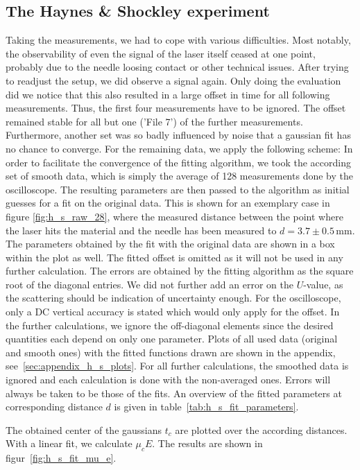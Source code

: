 \subsection{The Haynes \& Shockley experiment}

Taking the measurements, we had to cope with various difficulties. 
Most notably, the observability of even the signal 
of the laser itself ceased at one point, probably due to the needle 
loosing contact or other technical issues. 
After trying to readjust the setup, we did observe a signal 
again. 
Only doing the evaluation did we notice that this also resulted in 
a large offset in time for all following measurements. 
Thus, the first four measurements have to be ignored. The offset 
remained stable for all but one ('File 7') of the further measurements. 
Furthermore, another set was so badly influenced by noise that 
a gaussian fit has no chance to converge. 
For the remaining data, we apply the following scheme: 
In order to facilitate the convergence of the fitting algorithm, 
we took the according set of smooth data, which is simply the 
average of 128 measurements done by the oscilloscope. 
The resulting parameters are then passed to the algorithm
as initial guesses for a fit on the original data. 
This is shown for an exemplary case in figure \ref{fig:h_s_raw_28}, 
where the measured distance between the point where the laser 
hits the material and the needle has been measured to 
$d = 3.7 \pm 0.5\,$mm. 
The parameters obtained by the fit with the original data 
are shown in a box within the plot as well. 
The fitted offset is omitted as it will not be used in any further 
calculation. The errors 
are obtained by the fitting algorithm as the square root of the 
diagonal entries. We did not further add an error on the 
$U$-value, as the scattering should be indication of 
uncertainty enough. For the oscilloscope, only 
a DC vertical accuracy is stated which would 
only apply for the offset. 
In the further calculations, we ignore the 
off-diagonal elements since the desired quantities each depend 
on only one parameter. 
Plots of all used data (original and smooth ones) with the 
fitted functions drawn are shown in the appendix, 
see~\ref{sec:appendix_h_s_plots}.
For all further calculations, the smoothed data is ignored 
and each calculation is done with the non-averaged ones. 
Errors will always be taken to be those of the fits.
An overview of the fitted parameters at corresponding 
distance $d$ is given in table~\ref{tab:h_s_fit_parameters}.

The obtained center of the gaussians $t_c$ are plotted over the 
according distances. With a linear fit, we calculate $\mu_c E$. 
The results are shown in figur~\ref{fig:h_s_fit_mu_e}. 



